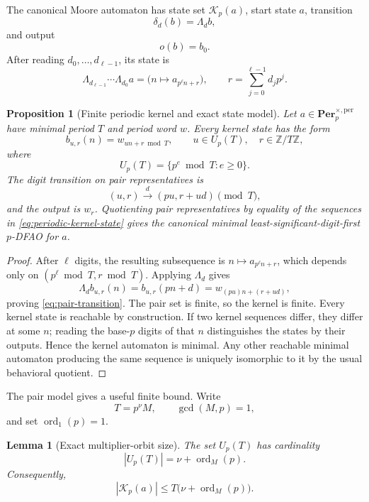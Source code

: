 \documentclass[11pt]{article}
\newtheorem{proposition}[theorem]{Proposition}
\newtheorem{lemma}[theorem]{Lemma}
\theoremstyle{definition}
\theoremstyle{remark}
\newcommand{\Per}{\mathbf{Per}}
\begin{document}
The canonical Moore automaton has state set \(\mathcal K_p(a)\), start state \(a\), transition
\[
\delta_d(b)=\Lambda_db,
\]
and output
\[
o(b)=b_0.
\]
After reading \(d_0,\ldots,d_{\ell-1}\), its state is
\[
\Lambda_{d_{\ell-1}}\cdots\Lambda_{d_0}a
=
\bigl(n\longmapsto a_{p^\ell n+r}\bigr),
\qquad
r=\sum_{j=0}^{\ell-1}d_jp^j.
\]

\begin{proposition}[Finite periodic kernel and exact state model]
\label{prop:periodic-kernel}
Let \(a\in\Per_p^{\times,\mathrm{per}}\) have minimal period \(T\) and period word \(w\).  Every kernel state has the form
\begin{equation}
\label{eq:periodic-kernel-state}
b_{u,r}(n)=w_{un+r\bmod T},
\qquad
u\in U_p(T),\quad r\in\mathbb Z/T\mathbb Z,
\end{equation}
where
\[
U_p(T)=\{p^e\bmod T:e\geq 0\}.
\]
The digit transition on pair representatives is
\begin{equation}
\label{eq:pair-transition}
(u,r)\xrightarrow{d}(pu,r+ud)\pmod T,
\end{equation}
and the output is \(w_r\).  Quotienting pair representatives by equality of the sequences in \cref{eq:periodic-kernel-state} gives the canonical minimal least-significant-digit-first \(p\)-DFAO for \(a\).
\end{proposition}

\begin{proof}
After \(\ell\) digits, the resulting subsequence is \(n\mapsto a_{p^\ell n+r}\), which depends only on \((p^\ell\bmod T,r\bmod T)\).  Applying \(\Lambda_d\) gives
\[
\Lambda_db_{u,r}(n)
=b_{u,r}(pn+d)
=w_{(pu)n+(r+ud)},
\]
proving \cref{eq:pair-transition}.  The pair set is finite, so the kernel is finite.  Every kernel state is reachable by construction.  If two kernel sequences differ, they differ at some \(n\); reading the base-\(p\) digits of that \(n\) distinguishes the states by their outputs.  Hence the kernel automaton is minimal.  Any other reachable minimal automaton producing the same sequence is uniquely isomorphic to it by the usual behavioral quotient.
\end{proof}

The pair model gives a useful finite bound.  Write
\[
T=p^\nu M,
\qquad
\gcd(M,p)=1,
\]
and set \(\operatorname{ord}_1(p)=1\).

\begin{lemma}[Exact multiplier-orbit size]
\label{lem:multiplier-orbit-size}
The set \(U_p(T)\) has cardinality
\begin{equation}
\label{eq:u-size}
|U_p(T)|
=
\nu+\operatorname{ord}_M(p).
\end{equation}
Consequently,
\begin{equation}
\label{eq:kernel-state-bound}
|\mathcal K_p(a)|
\leq
T\bigl(\nu+\operatorname{ord}_M(p)\bigr).
\end{equation}
\end{lemma}
\end{document}
